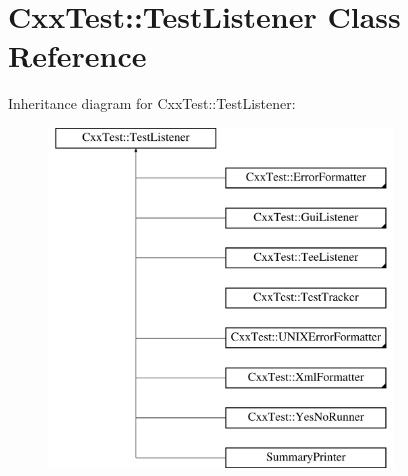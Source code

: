 \hypertarget{classCxxTest_1_1TestListener}{\section{Cxx\-Test\-:\-:Test\-Listener Class Reference}
\label{classCxxTest_1_1TestListener}
}
Inheritance diagram for Cxx\-Test\-:\-:Test\-Listener\-:\begin{figure}[H]
\begin{center}
\leavevmode
\includegraphics[height=9.000000cm]{classCxxTest_1_1TestListener}
\end{center}
\end{figure}
